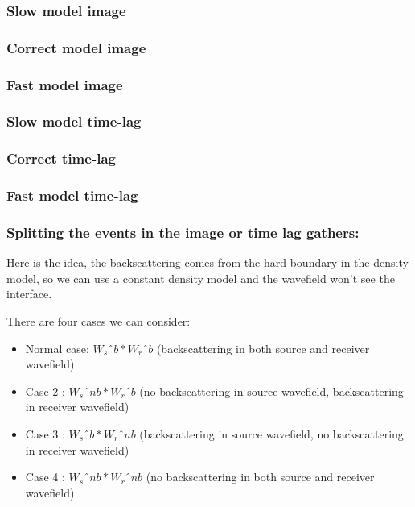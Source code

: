 \begin{frame} \frametitle{Slow model image    }  \end{frame}
\begin{frame} \frametitle{Correct model image}  \end{frame}
\begin{frame} \frametitle{Fast model image     }  \end{frame}

\begin{frame} \frametitle{Slow model time-lag}  \end{frame}
\begin{frame} \frametitle{Correct time-lag      }  \end{frame}
\begin{frame} \frametitle{Fast model time-lag }  \end{frame}


\begin{frame} \frametitle{ Splitting the events in the image or time lag gathers:}

Here is the idea, the backscattering comes from the hard boundary in the density model, so we 
can use a constant density model and the wavefield won't see the interface.

There are four cases we can consider: 
\begin{itemize}
	\item Normal case: $W_{s}ˆ{b} * W_{r}ˆ{b}$ (backscattering in both source and receiver wavefield)
	\item Case 2 : $W_{s}ˆ{nb} * W_{r}ˆ{b}$ (no backscattering in source wavefield, backscattering in receiver wavefield)
	\item Case 3 : $W_{s}ˆ{b} * W_{r}ˆ{nb}$ (backscattering in source wavefield, no backscattering in receiver wavefield)
	\item Case 4 : $W_{s}ˆ{nb} * W_{r}ˆ{nb}$ (no backscattering in both source and receiver wavefield)
\end{itemize}
\end{frame}

